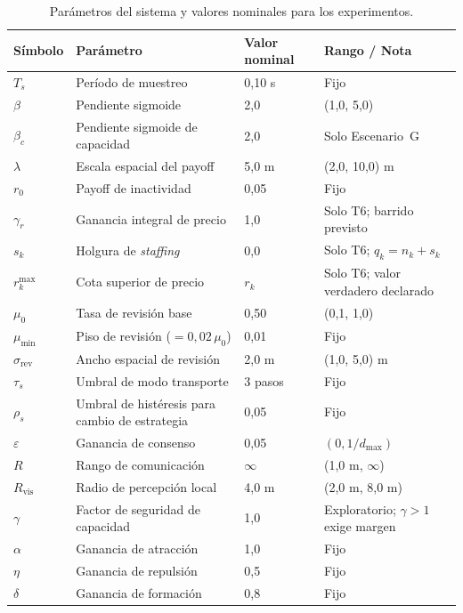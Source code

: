 \begin{table}[htbp]
\centering
\scriptsize
\renewcommand{\arraystretch}{1.08}
\caption[Parámetros del sistema]{Parámetros del sistema y valores nominales para los experimentos.}
\label{tab:params}
\begin{tabularx}{\textwidth}{>{\ttfamily}p{}p{}p{}Y}
\toprule
\normalfont Símbolo & Parámetro & Valor nominal & Rango / Nota \\
\midrule
$T_s$ & Período de muestreo & 0{,}10 s & Fijo \\
$\beta$ & Pendiente sigmoide & 2{,}0 & (1{,}0, 5{,}0) \\
$\beta_c$ & Pendiente sigmoide de capacidad & 2{,}0 & Solo Escenario~G \\
$\lambda$ & Escala espacial del payoff & 5{,}0 m & (2{,}0, 10{,}0) m \\
$r_0$ & Payoff de inactividad & 0{,}05 & Fijo \\
$\gamma_r$ & Ganancia integral de precio & 1{,}0 & Solo T6; barrido previsto \\
$s_k$ & Holgura de \emph{staffing} & 0{,}0 & Solo T6; $q_k=n_k+s_k$ \\
$r_k^{\max}$ & Cota superior de precio & $r_k$ & Solo T6; valor verdadero declarado \\
$\mu_0$ & Tasa de revisión base & 0{,}50 & (0{,}1, 1{,}0) \\
$\mu_{\min}$ & Piso de revisión ($= 0{,}02\,\mu_0$) & 0{,}01 & Fijo \\
$\sigma_{\text{rev}}$ & Ancho espacial de revisión & 2{,}0 m & (1{,}0, 5{,}0) m \\
$\tau_s$ & Umbral de modo transporte & 3 pasos & Fijo \\
$\rho_s$ & Umbral de histéresis para cambio de estrategia & 0{,}05 & Fijo \\
$\varepsilon$ & Ganancia de consenso & 0{,}05 & $(0, 1/d_{\max})$ \\
$R$ & Rango de comunicación & $\infty$ & (1{,}0 m, $\infty$) \\
$R_{\mathrm{vis}}$ & Radio de percepción local & 4{,}0 m & (2{,}0 m, 8{,}0 m) \\
$\gamma$ & Factor de seguridad de capacidad & 1{,}0 & Exploratorio; $\gamma>1$ exige margen \\
$\alpha$ & Ganancia de atracción & 1{,}0 & Fijo \\
$\eta$ & Ganancia de repulsión & 0{,}5 & Fijo \\
$\delta$ & Ganancia de formación & 0{,}8 & Fijo \\

\end{tabularx}
\end{table}
